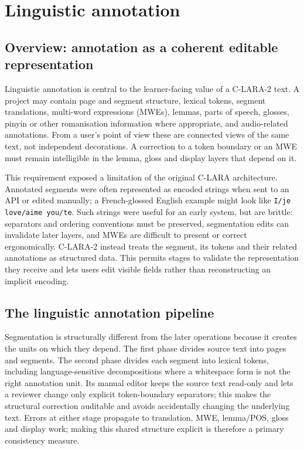 \section{Linguistic annotation}

\subsection{Overview: annotation as a coherent editable representation}

Linguistic annotation is central to the learner-facing value of a C-LARA-2
text. A project may contain page and segment structure, lexical tokens,
segment translations, multi-word expressions (MWEs), lemmas, parts of speech,
glosses, pinyin or other romanisation information where appropriate, and
audio-related annotations. From a user's point of view these are connected
views of the same text, not independent decorations. A correction to a token
boundary or an MWE must remain intelligible in the lemma, gloss and display
layers that depend on it.

This requirement exposed a limitation of the original C-LARA architecture.
Annotated segments were often represented as encoded strings when sent to an
API or edited manually; a French-glossed English example might look like
\texttt{I/je love/aime you/te}. Such strings were useful for an early system,
but are brittle: separators and ordering conventions must be preserved,
segmentation edits can invalidate later layers, and MWEs are difficult to
present or correct ergonomically. C-LARA-2 instead treats the segment, its
tokens and their related annotations as structured data. This permits stages
to validate the representation they receive and lets users edit visible
fields rather than reconstructing an implicit encoding.

\subsection{The linguistic annotation pipeline}

Segmentation is structurally different from the later operations because it
creates the units on which they depend. The first phase divides source text
into pages and segments. The second phase divides each segment into lexical
tokens, including language-sensitive decompositions where a whitespace form is
not the right annotation unit. Its manual editor keeps the source text
read-only and lets a reviewer change only explicit token-boundary separators;
this makes the structural correction auditable and avoids accidentally
changing the underlying text. Errors at either stage propagate to translation,
MWE, lemma/POS, gloss and display work; making this shared structure explicit
is therefore a primary consistency measure.

